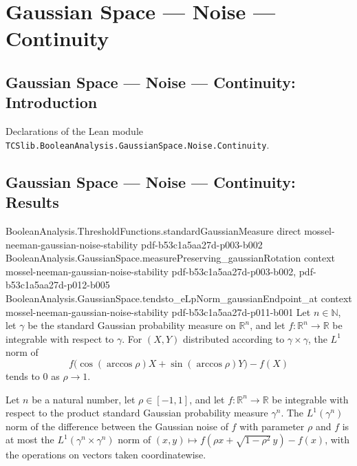 \section{Gaussian Space --- Noise --- Continuity}
\subsection*{Gaussian Space --- Noise --- Continuity: Introduction}

Declarations of the Lean module \texttt{TCSlib.BooleanAnalysis.GaussianSpace.Noise.Continuity}.

\subsection*{Gaussian Space --- Noise --- Continuity: Results}

\begin{lemma}
\label{BooleanAnalysis.GaussianSpace.tendsto_eLpNorm_gaussianEndpoint}
\leanok
{}
\proofstep
  {BooleanAnalysis.ThresholdFunctions.standardGaussianMeasure}
  {direct}
  {mossel-neeman-gaussian-noise-stability}
  {pdf-b53c1a5aa27d-p003-b002}
\proofstep
  {BooleanAnalysis.GaussianSpace.measurePreserving_gaussianRotation}
  {context}
  {mossel-neeman-gaussian-noise-stability}
  {pdf-b53c1a5aa27d-p003-b002,
    pdf-b53c1a5aa27d-p012-b005}
\proofstep
  {BooleanAnalysis.GaussianSpace.tendsto_eLpNorm_gaussianEndpoint_at}
  {context}
  {mossel-neeman-gaussian-noise-stability}
  {pdf-b53c1a5aa27d-p011-b001}
Let $n\in\mathbb N$, let $\gamma$ be the standard Gaussian probability measure on
$\mathbb R^n$, and let $f:\mathbb R^n\to\mathbb R$ be integrable with respect to
$\gamma$. For $(X,Y)$ distributed according to $\gamma\times\gamma$, the $L^1$ norm of
\[
f\bigl(\cos(\arccos\rho)X+\sin(\arccos\rho)Y\bigr)-f(X)
\]
tends to $0$ as $\rho\to1$.
\end{lemma}

\begin{lemma}
\label{BooleanAnalysis.GaussianSpace.eLpNorm_gaussianNoise_sub_le}
\leanok
{}
Let $n$ be a natural number, let $\rho\in[-1,1]$, and let $f:\mathbb R^n\to\mathbb R$ be
integrable with respect to the product standard Gaussian probability measure $\gamma^n$.
The $L^1(\gamma^n)$ norm of the difference between the Gaussian noise of $f$ with
parameter $\rho$ and $f$ is at most the $L^1(\gamma^n\times\gamma^n)$ norm of
$(x,y)\mapsto f(\rho x+\sqrt{1-\rho^2}\,y)-f(x)$, with the operations on vectors taken
coordinatewise.
\end{lemma}


